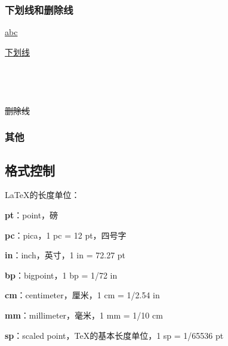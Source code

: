 \documentclass[twoside]{ctexart}
\begin{document}
	    \subsubsection{下划线和删除线}
            \underline{abc} 
		
            \uline{下划线}\\
            \\
            \\
            \\
            \\
            \sout{删除线}\\

        \subsubsection{其他}
    
    \subsection{格式控制}
            \LaTeX 的长度单位：

            \textbf{pt}：point，磅

            \textbf{pc}：pica，1 pc = 12 pt，四号字

            \textbf{in}：inch，英寸，1 in = 72.27 pt

            \textbf{bp}：bigpoint，1 bp = 1/72 in

            \textbf{cm}：centimeter，厘米，1 cm = 1/2.54 in

            \textbf{mm}：millimeter，毫米，1 mm = 1/10 cm

            \textbf{sp}：scaled point，\TeX 的基本长度单位，1 sp = 1/65536 pt
\end{document}
